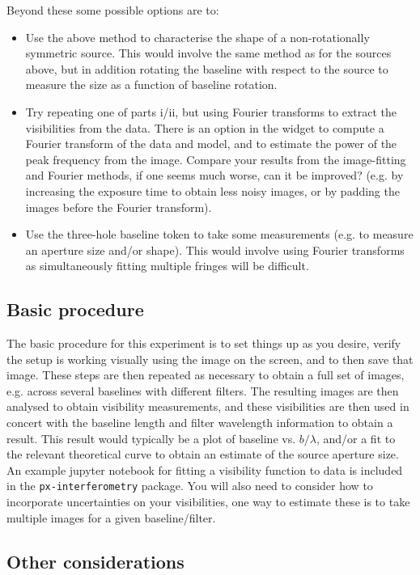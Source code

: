 \documentclass[11pt]{article}
\begin{document}
Beyond these some possible options are to:
\begin{itemize}
    \item Use the above method to characterise the shape of a non-rotationally symmetric source. This would involve the same method as for the sources above, but in addition rotating the baseline with respect to the source to measure the size as a function of baseline rotation.
    \item Try repeating one of parts i/ii, but using Fourier transforms to extract the visibilities from the data. There is an option in the widget to compute a Fourier transform of the data and model, and to estimate the power of the peak frequency from the image. Compare your results from the image-fitting and Fourier methods, if one seems much worse, can it be improved? (e.g. by increasing the exposure time to obtain less noisy images, or by padding the images before the Fourier transform).
    \item Use the three-hole baseline token to take some measurements (e.g. to measure an aperture size and/or shape). This would involve using Fourier transforms as simultaneously fitting multiple fringes will be difficult.
\end{itemize}

\subsection{Basic procedure}

The basic procedure for this experiment is to set things up as you desire, verify the setup is working visually using the image on the screen, and to then save that image. These steps are then repeated as necessary to obtain a full set of images, e.g. across several baselines with different filters. The resulting images are then analysed to obtain visibility measurements, and these visibilities are then used in concert with the baseline length and filter wavelength information to obtain a result. This result would typically be a plot of baseline vs. $b/\lambda$, and/or a fit to the relevant theoretical curve to obtain an estimate of the source aperture size. An example jupyter notebook for fitting a visibility function to data is included in the \texttt{px-interferometry} package. You will also need to consider how to incorporate uncertainties on your visibilities, one way to estimate these is to take multiple images for a given baseline/filter.

\subsection{Other considerations}
\end{document}
